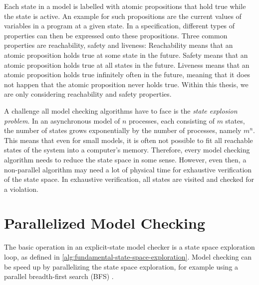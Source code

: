 \documentclass[
fancyheadings, %
%
%
]{stsreprt}
\begin{document}
Each state in a model is labelled with atomic propositions that hold true while the state is active.
An example for such propositions are the current values of variables in a program at a given state.
In a specification, different types of properties can then be expressed onto these propositions.
Three common properties are reachability, safety and liveness:
Reachability means that an atomic proposition holds true at some state in the future.
Safety means that an atomic proposition holds true at all states in the future.
Liveness means that an atomic proposition holds true infinitely often in the future, meaning that it does not happen that the atomic proposition never holds true.
Within this thesis, we are only considering reachability and safety properties.

A challenge all model checking algorithms have to face is the \emph{state explosion problem}.
In an asynchronous model of $n$ processes, each consisting of $m$ states, the number of states grows exponentially by the number of processes, namely $m^n$.
This means that even for small models, it is often not possible to fit all reachable states of the system into a computer's memory.
Therefore, every model checking algorithm needs to reduce the state space in some sense.
However, even then, a non-parallel algorithm may need a lot of physical time for exhaustive verification of the state space.
In exhaustive verification, all states are visited and checked for a violation.
\cite{Clarke2018.Introduction-to-Model-Checking,Holzmann2018.Explicit-State-Model-Checking}

\section{Parallelized Model Checking}
\label{section:background:parallelized-model-checking}

The basic operation in an explicit-state model checker is a state space exploration loop, as defined in \cref{alg:fundamental-state-space-exploration}.
Model checking can be speed up by parallelizing the state space exploration, for example using a parallel breadth-first search (BFS) \cite{Holzmann2012.Paralellizing-SPIN}.
\end{document}
